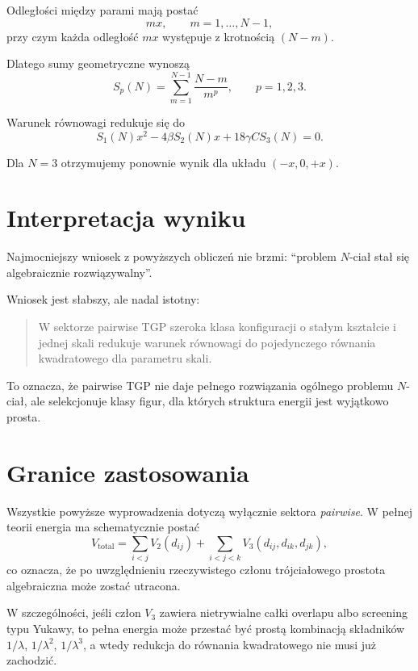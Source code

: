 \documentclass[11pt,a4paper]{article}
\theoremstyle{plain}
\theoremstyle{remark}
\begin{document}
Odległości między parami mają postać
\begin{equation}
mx,\qquad m=1,\dots,N-1,
\end{equation}
przy czym każda odległość $mx$ występuje z krotnością $(N-m)$.

Dlatego sumy geometryczne wynoszą
\begin{equation}
S_p(N)=\sum_{m=1}^{N-1}\frac{N-m}{m^p},
\qquad p=1,2,3.
\end{equation}

Warunek równowagi redukuje się do
\begin{equation}
\boxed{S_1(N)x^2 - 4\beta S_2(N)x + 18\gamma C S_3(N)=0.}
\end{equation}

Dla $N=3$ otrzymujemy ponownie wynik dla układu $(-x,0,+x)$.

\section{Interpretacja wyniku}

Najmocniejszy wniosek z powyższych obliczeń nie brzmi: ``problem $N$-ciał stał się algebraicznie rozwiązywalny''.

Wniosek jest słabszy, ale nadal istotny:
\begin{quote}
W sektorze pairwise TGP szeroka klasa konfiguracji o stałym kształcie i jednej skali redukuje warunek równowagi do pojedynczego równania kwadratowego dla parametru skali.
\end{quote}

To oznacza, że pairwise TGP nie daje pełnego rozwiązania ogólnego problemu $N$-ciał, ale selekcjonuje klasy figur, dla których struktura energii jest wyjątkowo prosta.

\section{Granice zastosowania}

Wszystkie powyższe wyprowadzenia dotyczą wyłącznie sektora \emph{pairwise}. W pełnej teorii energia ma schematycznie postać
\begin{equation}
V_{\mathrm{total}} = \sum_{i<j}V_2(d_{ij}) + \sum_{i<j<k}V_3(d_{ij},d_{ik},d_{jk}),
\end{equation}
co oznacza, że po uwzględnieniu rzeczywistego członu trójciałowego prostota algebraiczna może zostać utracona.

W szczególności, jeśli człon $V_3$ zawiera nietrywialne całki overlapu albo screening typu Yukawy, to pełna energia może przestać być prostą kombinacją składników $1/\lambda$, $1/\lambda^2$, $1/\lambda^3$, a wtedy redukcja do równania kwadratowego nie musi już zachodzić.
\end{document}
